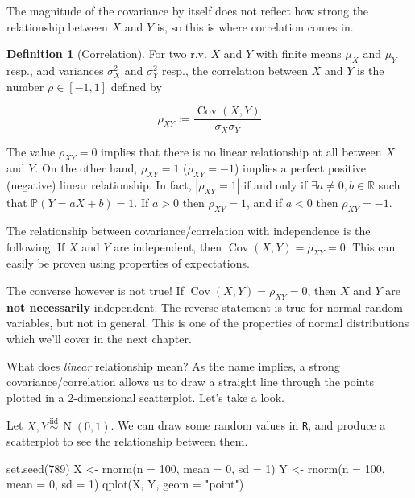 \documentclass[
]{book}
\newenvironment{Shaded}{\begin{snugshade}}{\end{snugshade}}
\newcommand{\AttributeTok}[1]{\textcolor[rgb]{0.77,0.63,0.00}{#1}}
\newcommand{\DecValTok}[1]{\textcolor[rgb]{0.00,0.00,0.81}{#1}}
\newcommand{\FunctionTok}[1]{\textcolor[rgb]{0.00,0.00,0.00}{#1}}
\newcommand{\NormalTok}[1]{#1}
\newcommand{\OtherTok}[1]{\textcolor[rgb]{0.56,0.35,0.01}{#1}}
\newcommand{\StringTok}[1]{\textcolor[rgb]{0.31,0.60,0.02}{#1}}
\DeclareMathOperator{\Cov}{Cov}
\DeclareMathOperator{\N}{N}
\newcommand{\iid}{\,\overset{\text{iid}}{\sim}\,}
\newcommand{\bbR}{\mathbb{R}}
\newcommand{\bbP}{\mathbb{P}}
\theoremstyle{definition}
\newtheorem{definition}{Definition}[chapter]
\theoremstyle{definition}
\theoremstyle{definition}
\theoremstyle{definition}
\theoremstyle{remark}
\begin{document}
The magnitude of the covariance by itself does not reflect how strong the relationship between \(X\) and \(Y\) is, so this is where correlation comes in.

\begin{definition}[Correlation]
For two r.v. \(X\) and \(Y\) with finite means \(\mu_X\) and \(\mu_Y\) resp., and variances \(\sigma^2_X\) and \(\sigma^2_Y\) resp., the correlation between \(X\) and \(Y\) is the number \(\rho\in[-1,1]\) defined by

\[
\rho_{XY} :=  \frac{\Cov(X,Y)}{\sigma_X\sigma_Y}
\]
\end{definition}

The value \(\rho_{XY}=0\) implies that there is no linear relationship at all between \(X\) and \(Y\).
On the other hand, \(\rho_{XY}=1\) (\(\rho_{XY}=-1\)) implies a perfect positive (negative) linear relationship.
In fact, \(|\rho_{XY}=1|\) if and only if \(\exists a\neq 0,b\in\bbR\) such that \(\bbP(Y=aX+b)=1\).
If \(a>0\) then \(\rho_{XY}=1\), and if \(a<0\) then \(\rho_{XY}=-1\).

The relationship between covariance/correlation with independence is the following: If \(X\) and \(Y\) are independent, then \(\Cov(X,Y) =\rho_{XY}=0\). This can easily be proven using properties of expectations.

The converse however is not true!
If \(\Cov(X,Y)=\rho_{XY}=0\), then \(X\) and \(Y\) are \textbf{not necessarily} independent.
The reverse statement is true for normal random variables, but not in general.
This is one of the properties of normal distributions which we'll cover in the next chapter.

What does \emph{linear} relationship mean?
As the name implies, a strong covariance/correlation allows us to draw a straight line through the points plotted in a 2-dimensional scatterplot.
Let's take a look.

Let \(X,Y\iid\N(0,1)\).
We can draw some random values in \texttt{R}, and produce a scatterplot to see the relationship between them.

\begin{Shaded}
\begin{Highlighting}[]
\FunctionTok{set.seed}\NormalTok{(}\DecValTok{789}\NormalTok{)}
\NormalTok{X }\OtherTok{\textless{}{-}} \FunctionTok{rnorm}\NormalTok{(}\AttributeTok{n =} \DecValTok{100}\NormalTok{, }\AttributeTok{mean =} \DecValTok{0}\NormalTok{, }\AttributeTok{sd =} \DecValTok{1}\NormalTok{)}
\NormalTok{Y }\OtherTok{\textless{}{-}} \FunctionTok{rnorm}\NormalTok{(}\AttributeTok{n =} \DecValTok{100}\NormalTok{, }\AttributeTok{mean =} \DecValTok{0}\NormalTok{, }\AttributeTok{sd =} \DecValTok{1}\NormalTok{)}
\FunctionTok{qplot}\NormalTok{(X, Y, }\AttributeTok{geom =} \StringTok{"point"}\NormalTok{)}
\end{Highlighting}
\end{Shaded}
\end{document}
